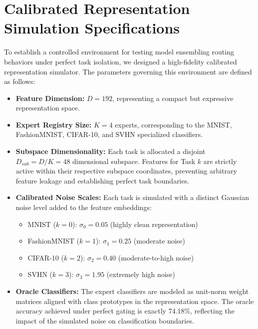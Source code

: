\documentclass{article}
\theoremstyle{plain}
\theoremstyle{definition}
\theoremstyle{remark}
\begin{document}










\newpage
\appendix
\onecolumn
\section{Calibrated Representation Simulation Specifications}
\label{app:simulation}

To establish a controlled environment for testing model ensembling routing behaviors under perfect task isolation, we designed a high-fidelity calibrated representation simulator. The parameters governing this environment are defined as follows:
\begin{itemize}
    \item \textbf{Feature Dimension:} $D = 192$, representing a compact but expressive representation space.
    \item \textbf{Expert Registry Size:} $K = 4$ experts, corresponding to the MNIST, FashionMNIST, CIFAR-10, and SVHN specialized classifiers.
    \item \textbf{Subspace Dimensionality:} Each task is allocated a disjoint $D_{sub} = D / K = 48$ dimensional subspace. Features for Task $k$ are strictly active within their respective subspace coordinates, preventing arbitrary feature leakage and establishing perfect task boundaries.
    \item \textbf{Calibrated Noise Scales:} Each task is simulated with a distinct Gaussian noise level added to the feature embeddings:
    \begin{itemize}
        \item MNIST ($k=0$): $\sigma_0 = 0.05$ (highly clean representation)
        \item FashionMNIST ($k=1$): $\sigma_1 = 0.25$ (moderate noise)
        \item CIFAR-10 ($k=2$): $\sigma_2 = 0.40$ (moderate-to-high noise)
        \item SVHN ($k=3$): $\sigma_3 = 1.95$ (extremely high noise)
    \end{itemize}
    \item \textbf{Oracle Classifiers:} The expert classifiers are modeled as unit-norm weight matrices aligned with class prototypes in the representation space. The oracle accuracy achieved under perfect gating is exactly 74.18\%, reflecting the impact of the simulated noise on classification boundaries.
\end{itemize}
\end{document}
